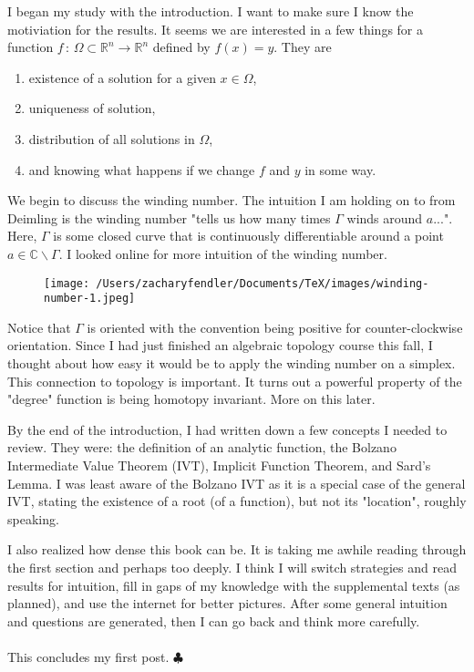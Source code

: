 \documentclass[reqno, 12pt]{article}
\newcommand{\R}{\mathbb{R}}
\newcommand{\END}{\hspace*{\fill} $\clubsuit$}
\begin{document}
I began my study with the introduction. I want to make sure I know the motiviation for the results. It seems we are interested in a few things for a function $f \,: \, \Omega \subset \R^n \rightarrow \R^n$ defined by $f(x) = y$. They are
\begin{enumerate}
\item existence of a solution for a given $x \in \Omega$,
\item uniqueness of solution,
\item distribution of all solutions in $\Omega$,
\item and knowing what happens if we change $f$ and $y$ in some way.
\end{enumerate}
We begin to discuss the winding number. The intuition I am holding on to from Deimling is the winding number "tells us how many times $\Gamma$ winds around $a$...". Here, $\Gamma$ is some closed curve that is continuously differentiable around a point $a \in \mathbb{C}\backslash\Gamma$. I looked online for more intuition of the winding number.
\begin{figure}[h]
	\centering
	\texttt{[image: /Users/zacharyfendler/Documents/TeX/images/winding-number-1.jpeg]}
\end{figure}
Notice that $\Gamma$ is oriented with the convention being positive for counter-clockwise orientation. Since I had just finished an algebraic topology course this fall, I thought about how easy it would be to apply the winding number on a simplex. This connection to topology is important. It turns out a powerful property of the "degree" function is being homotopy invariant. More on this later.

By the end of the introduction, I had written down a few concepts I needed to review. They were: the definition of an analytic function, the Bolzano Intermediate Value Theorem (IVT), Implicit Function Theorem, and Sard's Lemma. I was least aware of the Bolzano IVT as it is a special case of the general IVT, stating the existence of a root (of a function), but not its "location", roughly speaking. 

I also realized how dense this book can be. It is taking me awhile reading through the first section and perhaps too deeply. I think I will switch strategies and read results for intuition, fill in gaps of my knowledge with the supplemental texts (as planned), and use the internet for better pictures. After some general intuition and questions are generated, then I can go back and think more carefully. 
\\\\This concludes my first post. \END
\end{document}
